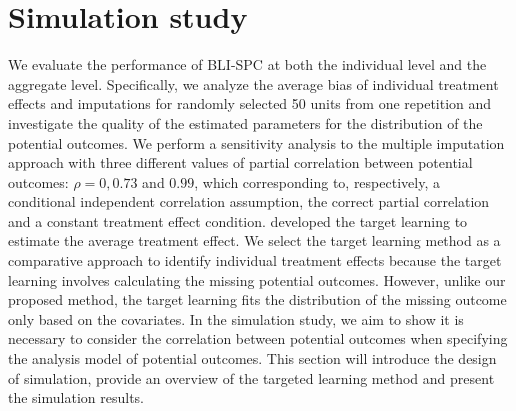 	\section{Simulation study}
	\label{sec:4.5}
	We evaluate the performance of BLI-SPC at both the individual level and the aggregate level. Specifically, we analyze the average bias of individual treatment effects and imputations for randomly selected 50 units from one repetition and investigate the quality of the estimated parameters for the distribution of the potential outcomes. We perform a sensitivity analysis to the multiple imputation approach with three different values of partial correlation between potential outcomes: $\rho = 0, 0.73 $ and $0.99$, which corresponding to, respectively, a conditional independent correlation assumption, the correct partial correlation and a constant treatment effect condition. \citet{van2011targeted} developed the target learning to estimate the average treatment effect. We select the target learning method as a comparative approach to identify individual treatment effects because the target learning involves calculating the missing potential outcomes. However, unlike our proposed method, the target learning fits the distribution of the missing outcome only based on the covariates. In the simulation study, we aim to show it is necessary to consider the correlation between potential outcomes when specifying the analysis model of potential outcomes. This section will introduce the design of simulation, provide an overview of the targeted learning method and present the simulation results.             
